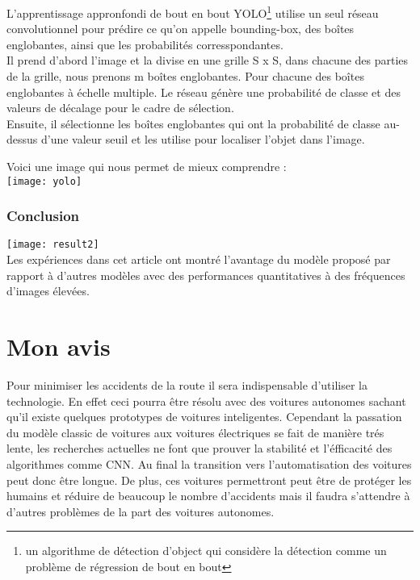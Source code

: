 \documentclass[french,a4paper,11pt,oneside]{article}
\begin{document}
{{{  				L'apprentissage appronfondi de bout en bout YOLO\footnote{un algorithme de détection d'object qui considère la détection comme un problème de régression de bout en bout} utilise un seul réseau convolutionnel pour prédire ce qu'on appelle bounding-box, des boîtes englobantes, ainsi que les probabilités corresspondantes.\\
  				Il prend d'abord l'image et la divise en une grille S x S, dans chacune des parties de la grille, nous prenons m boîtes englobantes.
  				Pour chacune des boîtes englobantes à échelle multiple. Le réseau génère une probabilité de classe et des valeurs de décalage pour le cadre de sélection.\\
  				Ensuite, il sélectionne les boîtes englobantes qui ont la probabilité de classe au-dessus d'une valeur seuil et les utilise pour localiser l'objet dans l'image.
  				
  				Voici une image qui nous permet de mieux comprendre :\\
  				\texttt{[image: yolo]}
  				
  			}
  			\subsubsection{Conclusion}{
  				\texttt{[image: result2]}\\
  				Les expériences dans cet article ont montré l'avantage du modèle proposé par rapport à d'autres modèles avec des performances quantitatives à des fréquences d'images élevées.\\
  			}
  	  	 }
    	
	}
	\section{Mon avis}{
		Pour minimiser les accidents de la route il sera indispensable d'utiliser la technologie. En effet ceci pourra être résolu avec des voitures autonomes sachant qu'il existe quelques prototypes de voitures inteligentes. Cependant la passation du modèle classic de voitures aux voitures électriques se fait de manière trés lente, les recherches actuelles ne font que prouver la stabilité et l'éfficacité des algorithmes comme CNN. Au final la transition vers l'automatisation des voitures peut donc être longue. De plus, ces voitures permettront peut être de protéger les humains et réduire de beaucoup le nombre d'accidents mais il faudra s'attendre à d'autres problèmes de la part des voitures autonomes.\\
	}
\end{document}
